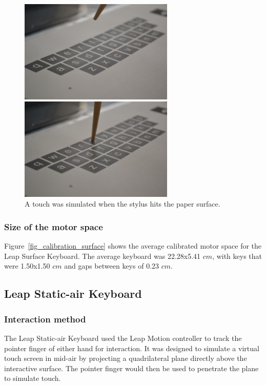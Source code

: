 \begin{figure}[!t]
	\centering
	\begin{minipage}[t]{5.8in}
		\begin{minipage}[t]{2.85in}
			\includegraphics[width=2.9in]{Figures/fig_surface_hover}
		\end{minipage}
		\begin{minipage}[t]{2.9in}
			\includegraphics[width=2.9in]{Figures/fig_surface_touch}
		\end{minipage}
	\end{minipage}
	\caption[Leap Surface Word Separation]{A touch was simulated when the stylus hits the paper surface.}
	\label{leap_surface_press_comparison}
\end{figure}

\subsubsection{Size of the motor space}
Figure~\ref{fig_calibration_surface} shows the average calibrated motor space for the Leap Surface Keyboard. The average keyboard was 22.28x5.41 $cm$, with keys that were 1.50x1.50 $cm$ and gaps between keys of 0.23 $cm$.

\subsection{Leap Static-air Keyboard} \label{static_air}
\subsubsection{Interaction method}
The Leap Static-air Keyboard used the Leap Motion controller to track the pointer finger of either hand for interaction. It was designed to simulate a virtual touch screen in mid-air by projecting a quadrilateral plane directly above the interactive surface. The pointer finger would then be used to penetrate the plane to simulate touch.

